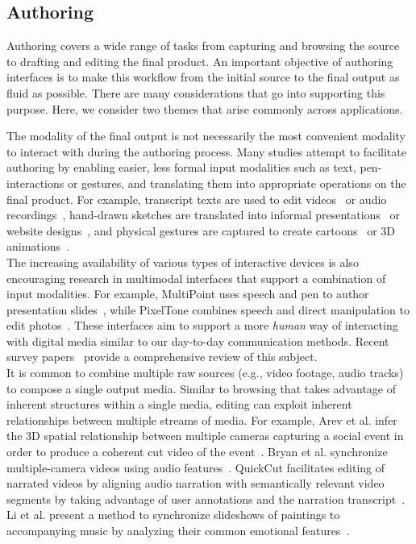 \subsection{Authoring}
Authoring covers a wide range of tasks from capturing and browsing the source to drafting and editing the final product. An important objective of authoring interfaces is to make this workflow from the initial source to the final output as fluid as possible. There are many considerations that go into supporting this purpose. Here, we consider two themes that arise commonly across applications. 
\begin{mldescription}
 The modality of the final output is not necessarily the most convenient modality to interact with during the authoring process. Many studies attempt to facilitate authoring by enabling easier, less formal input modalities such as text, pen-interactions or gestures, and translating them into appropriate operations on the final product. For example, transcript texts are used to edit videos~\cite{berthouzoz2012tools,casares2002simplifying} or audio recordings~\cite{rubin2013content}, hand-drawn sketches are translated into informal presentations~\cite{li2003sketching} or website designs~\cite{lin2000denim}, and physical gestures are captured to create cartoons~\cite{nara2013manga} or 3D animations~\cite{held20123d}.\\
The increasing availability of various types of interactive devices is also encouraging research in multimodal interfaces that support a combination of input modalities. For example, MultiPoint uses speech and pen to author presentation slides~\cite{sinha2001multipoint}, while PixelTone combines speech and direct manipulation to edit photos~\cite{laput2013pixeltone}. These interfaces aim to support a more \emph{human} way of interacting with digital media similar to our day-to-day communication methods. Recent survey papers~\cite{turk2014multimodal,dumas2009multimodal} provide a comprehensive review of this subject.\\

 It is common to combine multiple raw sources (e.g., video footage, audio tracks) to compose a single output media. Similar to browsing that takes advantage of inherent structures within a single media, editing can exploit inherent relationships between multiple streams of media. For example, Arev et al. infer the 3D spatial relationship between multiple cameras capturing a social event in order to produce a coherent cut video of the event~\cite{arev2014automatic}. Bryan et al. synchronize multiple-camera videos using audio features~\cite{bryan2012clustering}. QuickCut facilitates editing of narrated videos by aligning audio narration with semantically relevant video segments by taking advantage of user annotations and the narration transcript~\cite{truong2016quickcut}. Li et al. present a method to synchronize slideshows of paintings to accompanying music by analyzing their common emotional features~\cite{li2007emotion}. 

\end{mldescription}

